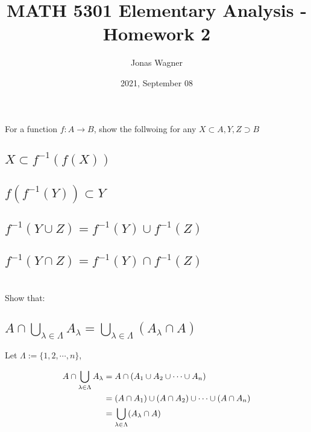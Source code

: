 \documentclass[]{article}
\title{MATH 5301 Elementary Analysis - Homework 2}
\author{Jonas Wagner}
\date{2021, September 08}
\begin{document}
\maketitle

\section{}
For a function $f : A \rightarrow B$, show the follwoing for any $X \subset A, Y, Z \supset B$

\subsection{$X \subset f^{-1}(f(X))$}




\subsection{$f(f^{-1}(Y)) \subset Y$}


\subsection{$f^{-1}(Y \cup Z) = f^{-1}(Y) \cup f^{-1}(Z)$}




\subsection{$f^{-1}(Y \cap Z) = f^{-1}(Y) \cap f^{-1}(Z)$}





\newpage
\section{}
Show that:

\subsection{
	$A \cap \bigcup\limits_{\lambda \in \Lambda}  A_\lambda 
	= \bigcup\limits_{\lambda \in \Lambda} (A_\lambda \cap A)$
}

Let $\Lambda := \{1, 2, \cdots, n\}$,

\begin{align*}
	A \cap \bigcup\limits_{\lambda \in \Lambda}  A_\lambda
	&= A \cap \qty(A_1 \cup A_2 \cup \cdots \cup A_n)\\
	&= (A \cap A_1) \cup (A \cap A_2) \cup \cdots \cup (A \cap A_n)\\
	&= \bigcup\limits_{\lambda \in \Lambda} (A_\lambda \cap A)
\end{align*}
\end{document}
